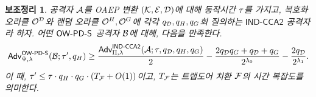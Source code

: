 \documentclass{article}
\newtheorem{lemma}{보조정리}
\theoremstyle{definition}
\begin{document}
\begin{tcolorbox}[colback=white]
	\begin{lemma}
		공격자 $\mathcal{A}$를 OAEP 변환 $(\mathcal{K}, \mathcal{E}, \mathcal{D})$에 대해 동작시간 $\tau$를 가지고,
		복호화 오라클 $\mathcal{O}^{\mathcal{D}}$와 랜덤 오라클 $\mathcal{O}^{H}, \mathcal{O}^{G}$에
		각각 $q_{\mathcal{D}}, q_{H}, q_{G}$회 질의하는
		$\textsf{IND-CCA2}$ 공격자라 하자. 어떤 $\textsf{OW-PD-S}$ 공격자 $\mathcal{B}$에 대해,
		다음을 만족한다.
		$$
			\textsf{Adv}^{\textsf{OW-PD-S}}_{\Psi, \lambda}(\mathcal{B}; \tau', q_{H})
		  	\ge \frac{\textsf{Adv}^{\textsf{IND-CCA2}}_{\Pi, \lambda}(\mathcal{A}; \tau, q_{\mathcal{D}}, q_{H}, q_{G})}{2}
		   	- \frac{2q_{\mathcal{D}}q_{G} + q_{\mathcal{D}} + q_{G}}{2^{\lambda_0}}
		   	- \frac{2q_{\mathcal{D}}}{2^{\lambda_1}}.
		$$
	  이 때, $\tau' \le \tau \cdot q_{H} \cdot q_{G} \cdot (T_{\mathcal{F}} +
	   O(1))$이고, $T_{\mathcal{F}}$는 트랩도어 치환 $\mathcal{F}$의 시간 복잡도를 의미한다.
	\end{lemma}
\end{tcolorbox}






\end{document}
